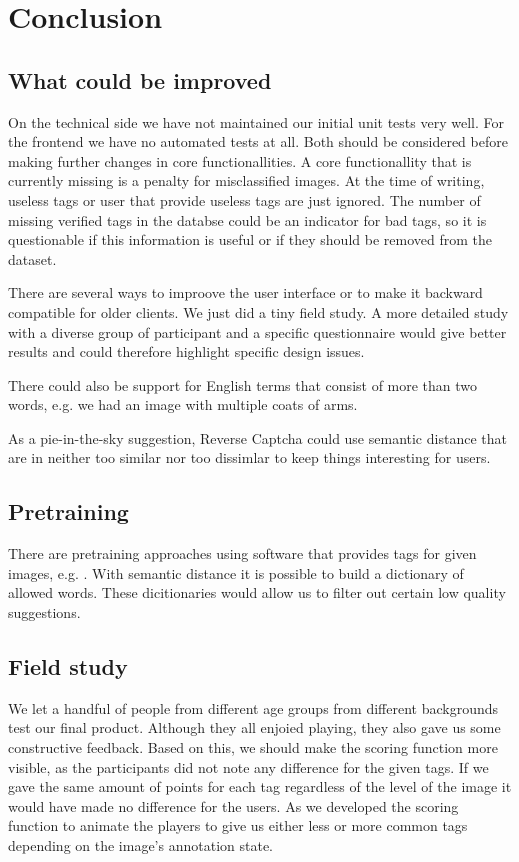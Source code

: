 \section{Conclusion}
\label{g1:sec:conclusion}

\subsection{What could be improved}
\label{g14:sec:conclusion:improved}
On the technical side we have not maintained our initial unit tests very well. For the frontend we have no automated tests at all. Both should be considered before making further changes in core functionallities.
A core functionallity that is currently missing is a penalty for misclassified images. At the time of writing, useless tags or user that provide useless tags are just ignored. The number of missing verified tags in the databse could be an indicator for bad tags, so it is questionable if this information is useful or if they should be removed from the dataset.

There are several ways to improove the user interface or to make it backward compatible for older clients. We just did a tiny field study. A more detailed study with a diverse group of participant and a specific questionnaire would give better results and could therefore highlight specific design issues.

There could also be support for English terms that consist of more than two words, e.g. we had an image with multiple coats of arms.

As a pie-in-the-sky suggestion, Reverse Captcha could use semantic distance that are in neither too similar nor too dissimlar to keep things interesting for users.


\subsection{Pretraining}
\label{g14:sec:conclusion:pretraining}
There are pretraining approaches using software that provides tags for given images, e.g. \cite{simonyan2014very}. With semantic distance it is possible to build a dictionary of allowed words. These dicitionaries would allow us to filter out certain low quality suggestions.

\subsection{Field study}
\label{g14:sec:conclusion:fieldstudy}
We let a handful of people from different age  groups from different backgrounds test our final product.
Although they all enjoied playing, they also gave us some constructive feedback.
Based on this, we should make the scoring function more visible, as the participants did not note any difference for the given tags.
If we gave the same amount of points for each tag regardless of the level of the image it would have made no difference for the users.
As we developed the scoring function to animate the players to give us either less or more common tags depending on the image's annotation state.

